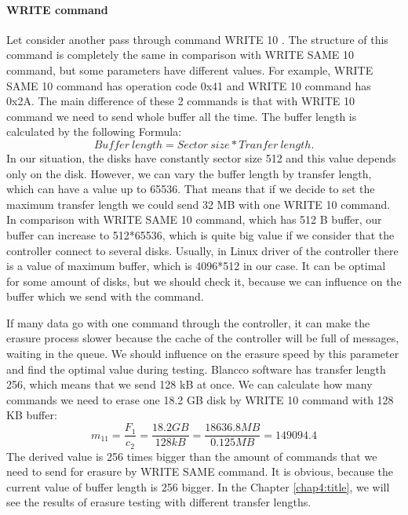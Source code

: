 \paragraph{WRITE command}
Let consider another pass through command WRITE 10 \cite{scsi3_bc}. The structure of this command is completely the same in comparison with WRITE SAME 10 command, but some parameters have different values. For example, WRITE SAME 10 command has operation code 0x41 and WRITE 10 command has 0x2A. The main difference of these 2 commands is that with WRITE 10 command we need to send whole buffer all the time. The buffer length is calculated by the following Formula:
\begin{equation}
	Buffer~length = Sector~size * Tranfer~length.
\end{equation}
In our situation, the disks have constantly sector size 512 and this value depends only on the disk. However, we can vary the buffer length by transfer length, which can have a value up to 65536. That means that if we decide to set the maximum transfer length we could send 32 MB with one WRITE 10 command. In comparison with WRITE SAME 10 command, which has 512 B buffer, our buffer can increase to 512*65536, which is quite big value if we consider that the controller connect to several disks. Usually, in Linux driver of the controller there is a value of maximum buffer, which is 4096*512 in our case. It can be optimal for some amount of disks, but we should check it, because we can influence on the buffer which we send with the command.

If many data go with one command through the controller, it can make the erasure process slower because the cache of the controller will be full of messages, waiting in the queue. We should influence on the erasure speed by this parameter and find the optimal value during testing. Blancco software has transfer length 256, which means that we send 128 kB at once. We can calculate how many commands we need to erase one 18.2 GB disk by WRITE 10 command with 128 KB buffer:
\begin{equation}
	m_{11}=\frac{F_{1}}{c_{2}}=\frac{18.2GB}{128kB}=\frac{18636.8MB}{0.125MB}=149094.4
\end{equation}
The derived value is 256 times bigger than the amount of commands that we need to send for erasure by WRITE SAME command. It is obvious, because the current value of buffer length is 256 bigger. In the Chapter \ref{chap4:title}, we will see the results of erasure testing with different transfer lengths.















